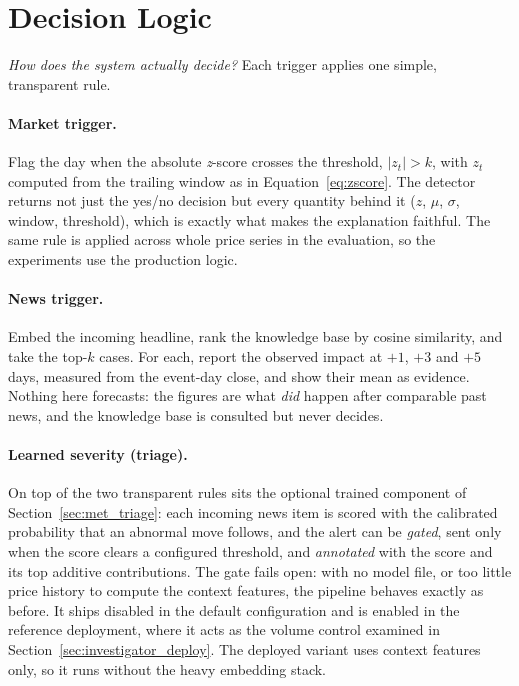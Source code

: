 \section{Decision Logic}
\label{sec:investigator_logic}

\emph{How does the system actually decide?} Each trigger applies one simple, transparent rule.

\paragraph{Market trigger.} Flag the day when the absolute \emph{z}-score crosses the threshold,
$|z_t|>k$, with $z_t$ computed from the trailing window as in Equation~\ref{eq:zscore}. The detector returns
not just the yes/no decision but every quantity behind it ($z$, $\mu$, $\sigma$, window, threshold), which
is exactly what makes the explanation faithful. The same rule is applied across whole price series in the
evaluation, so the experiments use the production logic.

\paragraph{News trigger.} Embed the incoming headline, rank the knowledge base by cosine similarity, and
take the top-$k$ cases. For each, report the observed impact at $+1$, $+3$ and $+5$ days, measured from the
event-day close, and show their mean as evidence. Nothing here forecasts: the figures are what \emph{did}
happen after comparable past news, and the knowledge base is consulted but never decides.

\paragraph{Learned severity (triage).} On top of the two transparent rules sits the optional trained
component of Section~\ref{sec:met_triage}: each incoming news item is scored with the calibrated
probability that an abnormal move follows, and the alert can be \emph{gated}, sent only when the score
clears a configured threshold, and \emph{annotated} with the score and its top additive contributions.
The gate fails open: with no model file, or too little price history to compute the context features, the
pipeline behaves exactly as before. It ships disabled in the default configuration and is enabled in the
reference deployment, where it acts as the volume control examined in
Section~\ref{sec:investigator_deploy}. The deployed variant uses
context features only, so it runs without the heavy embedding stack.

